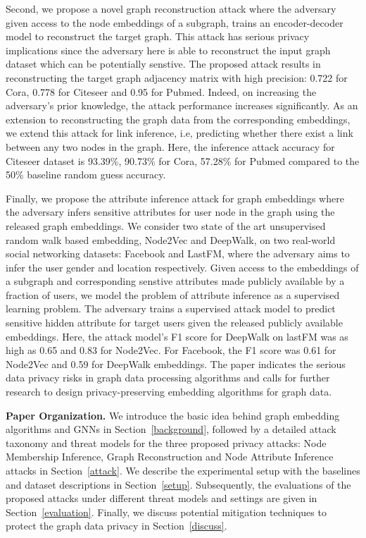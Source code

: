 Second, we propose a novel graph reconstruction attack where the adversary given access to the node embeddings of a subgraph, trains an encoder-decoder model to reconstruct the target graph.
This attack has serious privacy implications since the adversary here is able to reconstruct the input graph dataset which can be potentially senstive.
The proposed attack results in reconstructing the target graph adjacency matrix with high precision: 0.722 for Cora, 0.778 for Citeseer and 0.95 for Pubmed.
Indeed, on increasing the adversary's prior knowledge, the attack performance increases significantly.
As an extension to reconstructing the graph data from the corresponding embeddings, we extend this attack for link inference, i.e, predicting whether there exist a link between any two nodes in the graph.
Here, the inference attack accuracy for Citeseer dataset is 93.39\%, 90.73\% for Cora, 57.28\% for Pubmed compared to the 50\% baseline random guess accuracy.


Finally, we propose the attribute inference attack for graph embeddings where the adversary infers sensitive attributes for user node in the graph using the released graph embeddings.
We consider two state of the art unsupervised random walk based embedding, Node2Vec and DeepWalk, on two real-world social networking datasets: Facebook and LastFM, where the adversary aims to infer the user gender and location respectively.
Given access to the embeddings of a subgraph and corresponding senstive attributes made publicly available by a fraction of users, we model the problem of attribute inference as a supervised learning problem.
The adversary trains a supervised attack model to predict sensitive hidden attribute for target users given the released publicly available embeddings.
Here, the attack model's F1 score for DeepWalk on lastFM was as high as 0.65 and 0.83 for Node2Vec. For Facebook, the F1 score was 0.61 for Node2Vec and 0.59 for DeepWalk embeddings.
The paper indicates the serious data privacy risks in graph data processing algorithms and calls for further research to design privacy-preserving embedding algorithms for graph data.

\noindent\textbf{Paper Organization.}  We introduce the basic idea behind graph embedding algorithms and GNNs in Section~\ref{background}, followed by a detailed attack taxonomy and threat models for the three proposed privacy attacks: Node Membership Inference, Graph Reconstruction and Node Attribute Inference attacks in Section~\ref{attack}.
We describe the experimental setup with the baselines and dataset descriptions in Section~\ref{setup}.
Subsequently, the evaluations of the proposed attacks under different threat models and settings are given in Section~\ref{evaluation}.
Finally, we discuss potential mitigation techniques to protect the graph data privacy in Section~\ref{discuss}.
